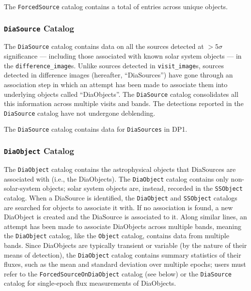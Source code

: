 The \texttt{ForcedSource} catalog contains a total of \nforcedsources entries across \nforcedobjects unique objects.

\subsubsection{\texttt{DiaSource} Catalog}
The \texttt{DiaSource} catalog \citep[][]{10.71929/rubin/2570317} contains data on all the sources detected at $>5\sigma$ significance --- including those associated with known solar system objects --- in the \texttt{difference\_image}s.
Unlike sources detected in \texttt{visit\_image}s, sources detected in difference images (hereafter, ``DiaSources'') have gone through an association step in which an attempt has been made to associate them into underlying objects called ``DiaObjects''.
The \texttt{DiaSource} catalog consolidates all this information across multiple visits and bands.
The detections reported in the \texttt{DiaSource} catalog have not undergone deblending.

The \texttt{DiaSource} catalog contains data for \ndiasources \texttt{DiaSources} in \gls{DP1}.

\subsubsection{\texttt{DiaObject} Catalog}
The \texttt{DiaObject} catalog \citep[][]{10.71929/rubin/2570319} contains the astrophysical objects that DiaSources are associated with (i.e., the DiaObjects).
The \texttt{DiaObject} catalog contains only non-solar-system objects; solar system objects are, instead, recorded in the \texttt{SSObject} catalog.
When a DiaSource is identified, the \texttt{DiaObject} and \texttt{SSObject} catalogs are searched for objects to associate it with.
If no association is found, a new DiaObject is created and the DiaSource is associated to it.
Along similar lines, an attempt has been made to associate DiaObjects across multiple bands, meaning the \texttt{DiaObject} catalog, like  the \texttt{Object} catalog, contains data from multiple bands.
Since DiaObjects are typically \gls{transient} or variable (by the nature of their means of detection), the \texttt{DiaObject} catalog contains summary statistics of their fluxes, such as the mean and standard deviation over multiple epochs; users must refer to the \texttt{ForcedSourceOnDiaObject} catalog (see below) or the \texttt{DiaSource} catalog for single-epoch \gls{flux} measurements of DiaObjects.

